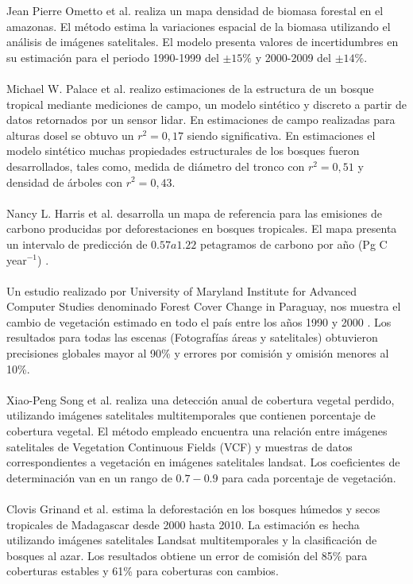 Jean Pierre Ometto et al. \cite{ometto2015amazon} realiza un mapa densidad de biomasa forestal en el amazonas. El m\'etodo estima la variaciones espacial de la biomasa utilizando el an\'alisis de im\'agenes satelitales. El modelo presenta valores de incertidumbres en su estimaci\'on para el periodo 1990-1999 del $ \pm 15\% $ y 2000-2009 del $ \pm 14\% $.\\~\\
Michael W. Palace et al. \cite{palace2015estimating} realizo estimaciones de la estructura de un bosque tropical mediante mediciones de campo, un modelo sint\'etico y  discreto a partir de datos retornados por un sensor lidar. En estimaciones de campo realizadas para alturas dosel se obtuvo un $ r^{2}=0,17 $ siendo significativa. En estimaciones el modelo sint\'etico muchas propiedades estructurales de los bosques fueron desarrollados, tales como, medida de di\'ametro del tronco con $ r^{2}=0,51 $ y densidad de \'arboles con $ r^{2}=0,43 $.\\~\\
Nancy L. Harris et al. \cite{harris2012baseline} desarrolla un mapa de referencia para las emisiones de carbono producidas por deforestaciones en bosques tropicales. El mapa presenta un intervalo de predicci\'on de $ 0.57 a 1.22 $ petagramos de carbono por a\~{n}o (Pg C year$ ^{-1} $) .\\~\\
Un estudio realizado por University of Maryland Institute for Advanced Computer Studies denominado Forest Cover Change in Paraguay, nos muestra el cambio de vegetaci\'on estimado en todo el pa\'is entre los a\~{n}os 1990 y 2000 \cite{huang2009assessment}. Los resultados para todas las escenas (Fotograf\'ias \'areas y satelitales) obtuvieron precisiones globales mayor al 90\% y errores por comisi\'on y omisi\'on menores al 10\%.\\~\\
Xiao-Peng Song et al. \cite{song2014annual} realiza una detecci\'on anual de cobertura vegetal perdido, utilizando im\'agenes satelitales multitemporales que contienen porcentaje de cobertura vegetal. El m\'etodo empleado encuentra una relaci\'on entre im\'agenes satelitales de Vegetation Continuous Fields (VCF) y muestras de datos correspondientes a vegetaci\'on en im\'agenes satelitales landsat. Los coeficientes de determinaci\'on van en un rango de $ 0.7 - 0.9 $ para cada porcentaje de vegetaci\'on.\\~\\
Clovis Grinand et al. \cite{grinand2013estimating} estima la deforestaci\'on en los bosques húmedos y secos tropicales de Madagascar desde 2000 hasta 2010. La estimaci\'on es hecha utilizando im\'agenes satelitales Landsat multitemporales y la clasificaci\'on de bosques al azar. Los resultados obtiene un error de comisi\'on del 85\% para coberturas estables y 61\% para coberturas con cambios.\\~\\
